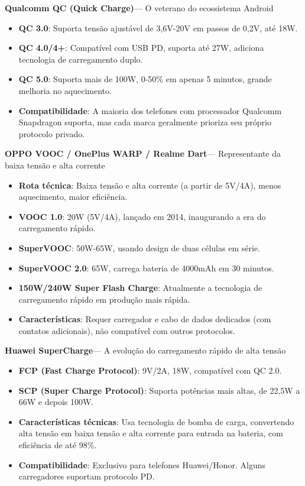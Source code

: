 \textbf{Qualcomm QC (Quick Charge)}— O veterano do ecossistema Android

\begin{itemize}
  \item \textbf{QC 3.0}: Suporta tensão ajustável de 3,6V-20V em passos de 0,2V, até 18W.
  \item \textbf{QC 4.0/4+}: Compatível com USB PD, suporta até 27W, adiciona tecnologia de carregamento duplo.
  \item \textbf{QC 5.0}: Suporta mais de 100W, 0-50\% em apenas 5 minutos, grande melhoria no aquecimento.
  \item \textbf{Compatibilidade}: A maioria dos telefones com processador Qualcomm Snapdragon suporta, mas cada marca geralmente prioriza seu próprio protocolo privado.
\end{itemize}

\textbf{OPPO VOOC / OnePlus WARP / Realme Dart}— Representante da baixa tensão e alta corrente

\begin{itemize}
  \item \textbf{Rota técnica}: Baixa tensão e alta corrente (a partir de 5V/4A), menos aquecimento, maior eficiência.
  \item \textbf{VOOC 1.0}: 20W (5V/4A), lançado em 2014, inaugurando a era do carregamento rápido.
  \item \textbf{SuperVOOC}: 50W-65W, usando design de duas células em série.
  \item \textbf{SuperVOOC 2.0}: 65W, carrega bateria de 4000mAh em 30 minutos.
  \item \textbf{150W/240W Super Flash Charge}: Atualmente a tecnologia de carregamento rápido em produção mais rápida.
  \item \textbf{Características}: Requer carregador e cabo de dados dedicados (com contatos adicionais), não compatível com outros protocolos.
\end{itemize}

\textbf{Huawei SuperCharge}— A evolução do carregamento rápido de alta tensão

\begin{itemize}
  \item \textbf{FCP (Fast Charge Protocol)}: 9V/2A, 18W, compatível com QC 2.0.
  \item \textbf{SCP (Super Charge Protocol)}: Suporta potências mais altas, de 22,5W a 66W e depois 100W.
  \item \textbf{Características técnicas}: Usa tecnologia de bomba de carga, convertendo alta tensão em baixa tensão e alta corrente para entrada na bateria, com eficiência de até 98\%.
  \item \textbf{Compatibilidade}: Exclusivo para telefones Huawei/Honor. Alguns carregadores suportam protocolo PD.
\end{itemize}

